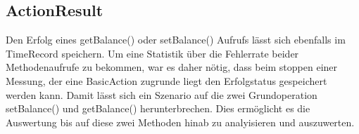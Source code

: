 \subsection{ActionResult}
\label{sec:ActionResult}
Den Erfolg eines getBalance() oder setBalance() Aufrufs lässt sich ebenfalls im TimeRecord speichern. Um eine Statistik über die Fehlerrate beider Methodenaufrufe zu bekommen, war es daher nötig, dass beim stoppen einer Messung, der eine BasicAction zugrunde liegt den Erfolgstatus gespeichert werden kann. Damit lässt sich ein Szenario auf die zwei Grundoperation setBalance() und getBalance() herunterbrechen. Dies ermöglicht es die Auswertung bis auf diese zwei Methoden hinab zu analyisieren und auszuwerten.

